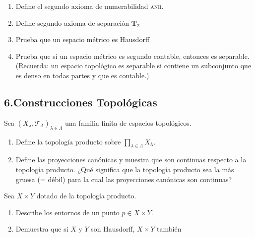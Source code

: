 \documentclass[b5paper,10pt,twoside]{book}
\begin{document}
\pagebreak

\begin{problem}\hfill
\begin{enumerate}[label=(\roman*)]
\item Define  el segundo  axioma de numerabilidad  {\scshape anii}.
\item Define segundo  axioma de separación \(\mathbf{T}_2\)
\item Prueba que un espacio métrico es  Hausdorff
\item Prueba que si un espacio métrico es segundo contable, entonces es separable. (Recuerda: un espacio topológico es separable si contiene un subconjunto que es denso en todas partes y que es contable.)
\end{enumerate}

\end{problem}


\subsection*{6.\enspace Construcciones Topológicas}


\begin{problem}
Sea \((X_\lambda, \mathcal{T}_\Lambda)_{\lambda\in\Lambda}\)
una familia finita de espacios topológicos.
\begin{enumerate}[label=(\roman*)]
\item Define 
la topología producto sobre \(\prod\limits_{\lambda\in\Lambda} X_\lambda\).

\item Define las proyecciones canónicas y muestra que son continuas respecto a la topología producto. ¿Qué significa que la topología producto sea la más gruesa (= débil) para la cual las proyecciones canónicas son continuas?
\end{enumerate}

\end{problem}

 
\begin{problem}
Sea \(X\times Y\) dotado de la topología 
producto.
\begin{enumerate}[label=(\roman*)]
\item Describe los entornos  de un punto  \(p\in X\times Y\).
\item Demuestra que si \(X\) y \(Y\) son Hausdorff, \(X\times Y\) también
\end{enumerate}

\end{problem}
\end{document}
